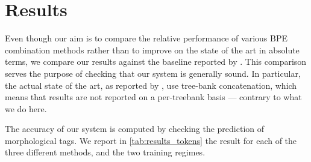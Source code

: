 \documentclass[11pt]{article}
\newcommand\citet{\cite}
\begin{document}
	
	\section{Results}
	\label{results}

        Even though our aim is to compare the relative performance of
        various BPE combination methods rather than to improve on the
        state of the art in absolute terms, we compare our results
        against the baseline reported by
        \citet{mccarthy2019sigmorphon}. This comparison serves the
        purpose of checking that our system is generally sound.  In
        particular, the actual state of the art, as reported by
        \citet{mccarthy2019sigmorphon,kondratyukstraka}, use tree-bank concatenation,
        which means that results are not reported on a per-treebank
        basis --- contrary to what we do here.

        The accuracy of our system is computed by checking the prediction
        of morphological tags. We report in \cref{tab:results_tokens}
        the result for each of the three different methods, and the
        two training regimes.

\end{document}
